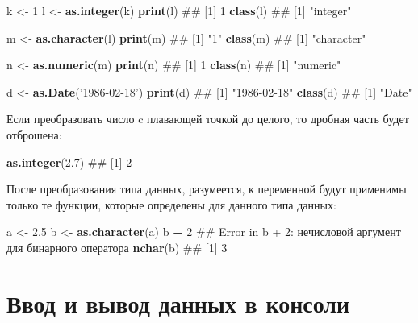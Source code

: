 \documentclass[]{book}
\newenvironment{Shaded}{\begin{snugshade}}{\end{snugshade}}
\newcommand{\KeywordTok}[1]{\textcolor[rgb]{0.13,0.29,0.53}{\textbf{#1}}}
\newcommand{\DecValTok}[1]{\textcolor[rgb]{0.00,0.00,0.81}{#1}}
\newcommand{\FloatTok}[1]{\textcolor[rgb]{0.00,0.00,0.81}{#1}}
\newcommand{\StringTok}[1]{\textcolor[rgb]{0.31,0.60,0.02}{#1}}
\newcommand{\OperatorTok}[1]{\textcolor[rgb]{0.81,0.36,0.00}{\textbf{#1}}}
\newcommand{\NormalTok}[1]{#1}
\begin{document}
\begin{Shaded}
\begin{Highlighting}[]
\NormalTok{k <-}\StringTok{ }\DecValTok{1}
\NormalTok{l <-}\StringTok{ }\KeywordTok{as.integer}\NormalTok{(k)}
\KeywordTok{print}\NormalTok{(l)}
\NormalTok{## [1] 1}
\KeywordTok{class}\NormalTok{(l)}
\NormalTok{## [1] "integer"}

\NormalTok{m <-}\StringTok{ }\KeywordTok{as.character}\NormalTok{(l)}
\KeywordTok{print}\NormalTok{(m)}
\NormalTok{## [1] "1"}
\KeywordTok{class}\NormalTok{(m)}
\NormalTok{## [1] "character"}

\NormalTok{n <-}\StringTok{ }\KeywordTok{as.numeric}\NormalTok{(m)}
\KeywordTok{print}\NormalTok{(n)}
\NormalTok{## [1] 1}
\KeywordTok{class}\NormalTok{(n)}
\NormalTok{## [1] "numeric"}

\NormalTok{d <-}\StringTok{ }\KeywordTok{as.Date}\NormalTok{(}\StringTok{'1986-02-18'}\NormalTok{)}
\KeywordTok{print}\NormalTok{(d)}
\NormalTok{## [1] "1986-02-18"}
\KeywordTok{class}\NormalTok{(d)}
\NormalTok{## [1] "Date"}
\end{Highlighting}
\end{Shaded}

Если преобразовать число c плавающей точкой до целого, то дробная часть
будет отброшена:

\begin{Shaded}
\begin{Highlighting}[]
\KeywordTok{as.integer}\NormalTok{(}\FloatTok{2.7}\NormalTok{)}
\NormalTok{## [1] 2}
\end{Highlighting}
\end{Shaded}

После преобразования типа данных, разумеется, к переменной будут
применимы только те функции, которые определены для данного типа данных:

\begin{Shaded}
\begin{Highlighting}[]
\NormalTok{a <-}\StringTok{ }\FloatTok{2.5}
\NormalTok{b <-}\StringTok{ }\KeywordTok{as.character}\NormalTok{(a)}
\NormalTok{b }\OperatorTok{+}\StringTok{ }\DecValTok{2}
\NormalTok{## Error in b + 2: нечисловой аргумент для бинарного оператора}
\KeywordTok{nchar}\NormalTok{(b)}
\NormalTok{## [1] 3}
\end{Highlighting}
\end{Shaded}

\section{Ввод и вывод данных в консоли}\label{read_write_console}
\end{document}
